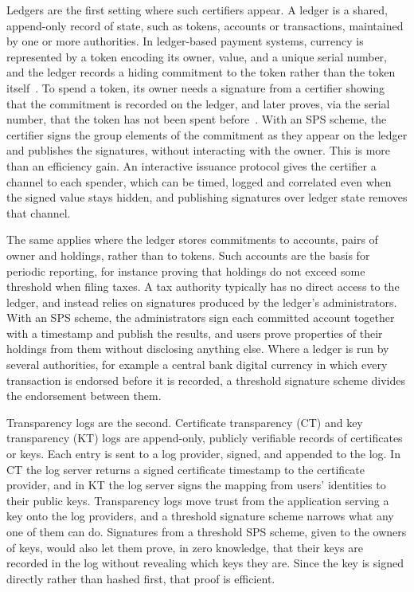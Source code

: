 Ledgers are the first setting where such certifiers appear. A ledger is a shared, append-only record of state, such as
tokens, accounts or transactions, maintained by one or more authorities. In
ledger-based payment systems, currency is represented by a token encoding its
owner, value, and a unique serial number, and the ledger records a hiding
commitment to the token rather than the token
itself~\cite{EPRINT:ACDDET19,EPRINT:TBAAGP22,CCS:KiaKohSar22,C:Pedersen91}. To
spend a token, its owner needs a signature from a certifier showing that the
commitment is recorded on the ledger, and later proves, via the serial number,
that the token has not been spent before~\cite{RSA:PoiSan18,NDSS:SABMD19}. With
an SPS scheme, the certifier signs the group elements of the
commitment as they appear on the ledger and publishes the signatures, without
interacting with the owner. This is more than an efficiency gain. An interactive
issuance protocol gives the certifier a channel to each spender, which can be
timed, logged and correlated even when the signed value stays hidden, and
publishing signatures over ledger state removes that channel.

The same applies where the ledger stores commitments to accounts, pairs of owner
and holdings, rather than to tokens. Such accounts are the basis for periodic
reporting, for instance proving that holdings do not exceed some threshold when
filing taxes. A tax authority typically has no direct access to the ledger, and
instead relies on signatures produced by the ledger's administrators. With an
SPS scheme, the administrators sign each committed account
together with a timestamp and publish the results, and users prove properties of
their holdings from them without disclosing anything else. Where a ledger is
run by several authorities, for example a central bank digital currency in which
every transaction is endorsed before it is recorded, a threshold signature
scheme divides the endorsement between them.

Transparency logs are the second. Certificate transparency (CT) and key
transparency (KT) logs are append-only, publicly verifiable records of
certificates or keys. Each entry is sent to a log provider, signed, and appended
to the log. In CT the log server returns a signed certificate timestamp to the
certificate provider, and in KT the log server signs the mapping from users'
identities to their public keys. Transparency logs move trust from the application
serving a key onto the log providers, and a threshold signature scheme narrows
what any one of them can do. Signatures from a threshold SPS scheme, given to the
owners of keys, would also let them prove, in zero knowledge, that their keys are
recorded in the log without revealing which keys they are. Since the key is signed
directly rather than hashed first, that proof is efficient.

